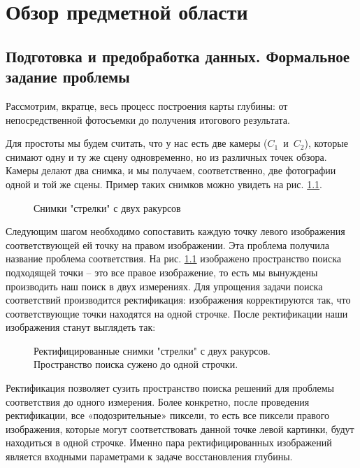 \chapter{Обзор предметной области}
\label{chapter1}

\section{Подготовка и предобработка данных. Формальное
задание проблемы}
\label{problem}

Рассмотрим, вкратце, весь процесс построения карты глубины: от непосредственной фотосъемки до получения итогового результата.

Для простоты мы будем считать, что у нас есть две камеры ($C_1$~и~$C_2$), 
которые снимают одну и ту же сцену одновременно, но из различных точек 
обзора. Камеры делают два снимка, и мы получаем, соответственно, две 
фотографии одной и той же сцены.  Пример таких снимков можно увидеть на рис. \ref{pic:1}.

\begin{figure}[h!]
\caption{Снимки "стрелки" с двух ракурсов}
\label{pic:1}
\end{figure}

Следующим шагом необходимо сопоставить каждую точку левого 
изображения соответствующей ей точку на правом изображении. Эта 
проблема получила название проблема соответствия. На рис. \ref{pic:1}
изображено пространство поиска подходящей точки – это все правое 
изображение, то есть мы вынуждены производить наш поиск в двух 
измерениях. Для упрощения задачи поиска соответствий производится ректификация: изображения корректируются так, что соответствующие точки находятся на одной строчке.  После ректификации наши изображения станут выглядеть так:

\begin{figure}[h!]
\caption{Ректифицированные снимки "стрелки" с двух ракурсов. Пространство поиска сужено до 
одной строчки.}
\label{pic:2}
\end{figure}

Ректификация позволяет сузить пространство поиска решений для 
проблемы соответствия до одного измерения. Более конкретно, после 
проведения ректификации, все «подозрительные» пиксели, то есть все 
пиксели правого изображения, которые могут соответствовать данной точке 
левой картинки, будут находиться в одной строчке. Именно пара 
ректифицированных изображений является входными параметрами к задаче 
восстановления глубины. 

